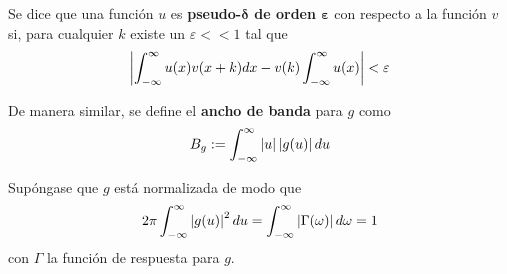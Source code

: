 \begin{definicion}
Se dice que una función $u$ es 
\textbf{pseudo-$\boldsymbol{\delta}$ de orden $\boldsymbol{\varepsilon}$} con respecto a la función $v$ si, para cualquier $k$ existe un $\varepsilon << 1$ tal que 
\begin{equation}
\left| \int_{-\infty}^{\infty} u(x) v(x+k) dx  -  v(k)\int_{-\infty}^{\infty} u(x) \right| < \varepsilon
\end{equation}
\end{definicion}


De manera similar, se define el \textbf{ancho de banda} para $g$ como 
\begin{equation}
B_g := \int_{-\infty}^{\infty} \left| u \right| \left| g(u) \right| du
\end{equation}

Supóngase que $g$ está normalizada de modo que
\begin{equation}
2 \pi \int_{-\infty}^{\infty} \left| g(u) \right|^{2} du = \int_{-\infty}^{\infty} \left| \Gamma(\omega) \right| d\omega = 1
\label{s6:norm_g}
\end{equation}
con $\Gamma$ la función de respuesta para $g$.

